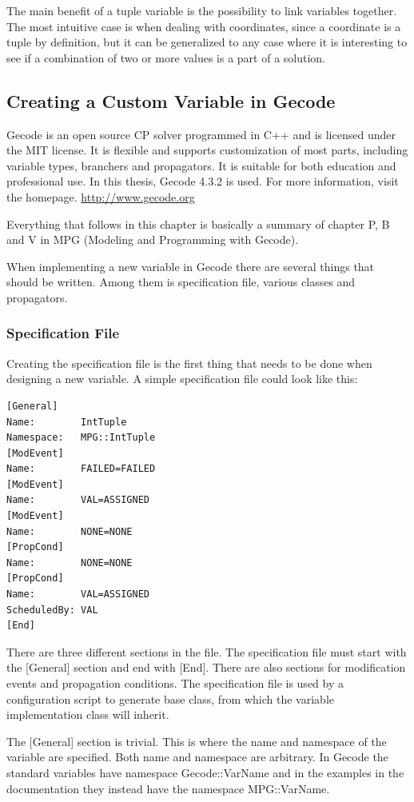 \documentclass[a4paper,11pt]{article}
\begin{document}
The main benefit of a tuple variable is the possibility to link variables together. The most intuitive case is when dealing with coordinates, since a coordinate is a tuple by definition, but it can be generalized to any case where it is interesting to see if a combination of two or more values is a part of a solution. 

\subsection{Creating a Custom Variable in Gecode}
Gecode is an open source CP solver programmed in C++ and is licensed under the MIT license. It is flexible and supports customization of most parts, including variable types, branchers and propagators. It is suitable for both education and professional use. In this thesis, Gecode 4.3.2 is used. For more information, visit the homepage. \url{http://www.gecode.org}

Everything that follows in this chapter is basically a summary of chapter P, B and V in MPG (Modeling and Programming with Gecode). 

When implementing a new variable in Gecode there are several things that should be written. Among them is specification file, various classes and propagators.
\subsubsection{Specification File}\label{sec:specfile}
Creating the specification file is the first thing that needs to be done when designing a new variable.  A simple specification file could look like this:

\begin{lstlisting}[frame=single]
[General]
Name:        IntTuple
Namespace:   MPG::IntTuple
[ModEvent]
Name:        FAILED=FAILED
[ModEvent]
Name:        VAL=ASSIGNED
[ModEvent]
Name:        NONE=NONE
[PropCond]
Name:        NONE=NONE
[PropCond]
Name:        VAL=ASSIGNED
ScheduledBy: VAL
[End]
\end{lstlisting}
There are three different sections in the file. The specification file must start with the [General] section and end with [End]. There are also sections for modification events and propagation conditions. The specification file is used by a configuration script to generate base class, from which the variable implementation class will inherit.

The [General] section is trivial. This is where the name and namespace of the variable are specified. Both name and namespace are arbitrary. In Gecode the standard variables have namespace Gecode::VarName and in the examples in the documentation they instead have the namespace MPG::VarName.
\end{document}
